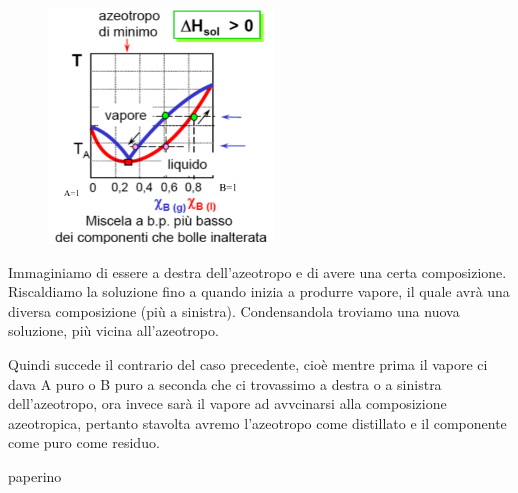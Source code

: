\begin{minipage}{0.4\textwidth}
    \begin{figure}[H]
        \includegraphics[width=6cm]{immagini/distillazione_endotermica.png}
    \end{figure}
\end{minipage}
\begin{minipage}{0.6\textwidth}
    \vspace{0.6cm}Immaginiamo di essere a destra dell'azeotropo e di avere una certa composizione. Riscaldiamo la soluzione fino a quando inizia a produrre vapore, il quale avrà una diversa composizione (più a sinistra). Condensandola troviamo una nuova soluzione, più vicina all'azeotropo.

    Quindi succede il contrario del caso precedente, cioè mentre prima il vapore ci dava A puro o B puro a seconda che ci trovassimo a destra o a sinistra dell'azeotropo, ora invece sarà il vapore ad avvcinarsi alla composizione azeotropica, pertanto stavolta avremo l'azeotropo come distillato e il componente come puro come residuo.
\end{minipage}

paperino